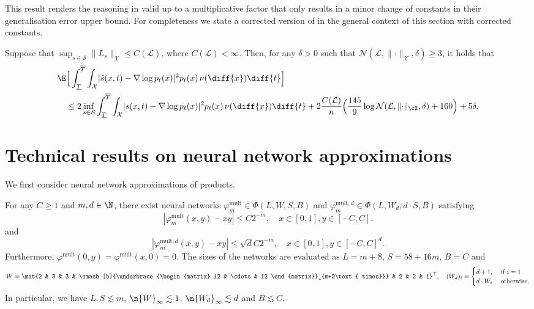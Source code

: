 \documentclass[a4paper, 11pt, headings = small, abstract]{scrartcl}
\begin{document}
 This result renders the reasoning in \cite[Theorem C.4]{oko23} valid up to a multiplicative factor that only results in a minor change of  constants in their generalisation error upper bound. For completeness we state a corrected version of \cite[Theorem C.4]{oko23} in the general context of this section with corrected constants. 
 
\begin{theorem}
	Suppose that $\sup_{s \in \mathcal{S}} \lVert L_{s} \rVert_{\mathcal{X}} \leq C(\mathcal{L})$, where $C(\mathcal{L}) < \infty$.  Then, for any $\delta > 0$ such that $\mathcal{N}(\mathcal{L},\lVert \cdot \rVert_{\mathcal{X}}, \delta) \geq 3$, it holds that
	\begin{equation*} 
		\begin{split}
			&\E\Big[\int_{\underline{T}}^{\overline{T}} \int_{\mathcal{X}} \lvert \hat{s}(x,t) - \nabla \log p_t(x) \rvert^2 p_t(x) \,\nu(\diff{x}) \diff{t}  \Big] \\ 
			&\quad \leq 2 \inf_{s \in \mathcal{S}} \int_{\underline{T}}^{\overline{T}} \int_{\mathcal{X}} \lvert s(x,t) - \nabla \log p_t(x) \rvert^2 p_t(x) \,\nu(\diff{x}) \diff{t} + 2\frac{C(\mathcal{L})}{n}\Big(\frac{145}{9}\log \mathcal{N}(\mathcal{L}, \lVert \cdot \rVert_{\cX}, \delta) + 160\Big) + 5\delta.
		\end{split}
	\end{equation*}
\end{theorem}


\section{Technical results on neural network approximations}\label{app:neural}
We first consider neural network approximations of products.
\begin{lemma}
\label{lemma:mult_network}
    For any $C\ge1$ and $m, d\in\N$, there exist neural networks $\varphi^{\mathrm{mult}}_m\in\Phi(L, W, S, B)$ and $\varphi^{\mathrm{mult}, d}_m\in\Phi(L, W_d, d\cdot S, B)$ satisfying
    \[
        |\varphi^{\mathrm{mult}}_m(x, y)-xy|
        \le C2^{-m},\quad x\in[0, 1],y\in[-C, C].
    \]
    and
    \[
        |\varphi^{\mathrm{mult}, d}_m(x, y)-xy|
        \le\sqrt{d}C2^{-m},\quad x\in[0, 1],y\in[-C, C]^d.
    \]
    Furthermore, $\varphi^{\mathrm{mult}}(0, y)=\varphi^{\mathrm{mult}}(x, 0)=0$.
    The sizes of the networks are evaluated as $L=m+8$, $S=58+16m$, $B=C$ and
    \begin{gather*}
        W
        =\mat{2 & 3 & 3 & \smash[b]{\underbrace{\begin{matrix}
            12 & \cdots & 12
        \end{matrix}}_{m+2\text{ times}}} & 2 & 2 & 1}^\top,\quad
        (W_d)_i
        =\begin{cases}
            d+1, &\text{ if }i=1\\
            d\cdot W_i &\text{ otherwise.}
        \end{cases}
    \end{gather*}
    In particular, we have $L, S\lesssim m$, $\n{W}_{\infty}\lesssim1$, $\n{W_d}_{\infty}\lesssim d$ and $B\lesssim C$.
\end{lemma}
\end{document}
